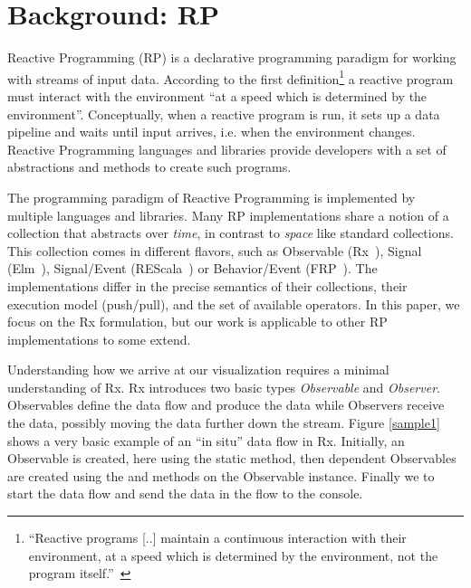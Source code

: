 \section{Background: RP}
\label{background}
\label{nutshell}

Reactive Programming (RP) is a declarative programming paradigm for working with streams of input data. 
According to the first definition\footnote{
``Reactive programs [..] maintain a continuous interaction with their environment, at a speed which is determined by the environment, not the program itself.''~\cite{berry1989real}
} a reactive program must interact with the environment ``at a speed which is determined by the environment''.
Conceptually, when a reactive program is run, it sets up a data pipeline and waits until input arrives, i.e. when the environment changes.
Reactive Programming languages and libraries provide developers with a set of abstractions and methods to create such programs.

The programming paradigm of Reactive Programming is implemented by multiple languages and libraries. 
Many RP implementations share a notion of a collection that abstracts over \emph{time}, in contrast to \emph{space} like standard collections.
This collection comes in different flavors, 
such as Observable (Rx~\cite{meijer2010subject}), 
Signal (Elm~\cite{czaplicki2012elm}), 
Signal/Event (REScala~\cite{salvaneschi2014rescala}) or 
Behavior/Event (FRP~\cite{elliott1997functional}).
The implementations differ in the precise semantics of their collections, their execution model (push/pull), and the set of available operators.  
In this paper, we focus on the Rx formulation, but our work is applicable to other RP implementations to some extend. 

Understanding how we arrive at our visualization requires a minimal understanding of Rx.
Rx introduces two basic types \emph{Observable} and \emph{Observer}. Observables define the data flow and produce the data while Observers receive the data, possibly moving the data further down the stream. Figure \ref{sample1} shows a very basic example of an ``in situ'' data flow in Rx. Initially, an Observable is created, here using the static  method, then dependent Observables are created using the  and  methods on the Observable instance. Finally we  to start the data flow and send the data in the flow to the console.

